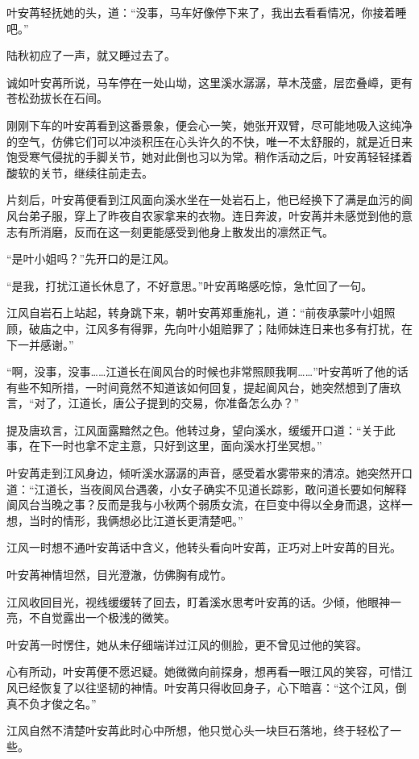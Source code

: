 叶安苒轻抚她的头，道：“没事，马车好像停下来了，我出去看看情况，你接着睡吧。”

陆秋初应了一声，就又睡过去了。

诚如叶安苒所说，马车停在一处山坳，这里溪水潺潺，草木茂盛，层峦叠嶂，更有苍松劲拔长在石间。

刚刚下车的叶安苒看到这番景象，便会心一笑，她张开双臂，尽可能地吸入这纯净的空气，仿佛它们可以冲淡积压在心头许久的不快，唯一不太舒服的，就是近日来饱受寒气侵扰的手脚关节，她对此倒也习以为常。稍作活动之后，叶安苒轻轻揉着酸软的关节，继续往前走去。

片刻后，叶安苒便看到江风面向溪水坐在一处岩石上，他已经换下了满是血污的阆风台弟子服，穿上了昨夜自农家拿来的衣物。连日奔波，叶安苒并未感觉到他的意志有所消磨，反而在这一刻更能感受到他身上散发出的凛然正气。

“是叶小姐吗？”先开口的是江风。

“是我，打扰江道长休息了，不好意思。”叶安苒略感吃惊，急忙回了一句。

江风自岩石上站起，转身跳下来，朝叶安苒郑重施礼，道：“前夜承蒙叶小姐照顾，破庙之中，江风多有得罪，先向叶小姐赔罪了；陆师妹连日来也多有打扰，在下一并感谢。”

“啊，没事，没事……江道长在阆风台的时候也非常照顾我啊……”叶安苒听了他的话有些不知所措，一时间竟然不知道该如何回复，提起阆风台，她突然想到了唐玖言，“对了，江道长，唐公子提到的交易，你准备怎么办？”

提及唐玖言，江风面露黯然之色。他转过身，望向溪水，缓缓开口道：“关于此事，在下一时也拿不定主意，只好到这里，面向溪水打坐冥想。”

叶安苒走到江风身边，倾听溪水潺潺的声音，感受着水雾带来的清凉。她突然开口道：“江道长，当夜阆风台遇袭，小女子确实不见道长踪影，敢问道长要如何解释阆风台当晚之事？反而是我与小秋两个弱质女流，在巨变中得以全身而退，这样一想，当时的情形，我俩想必比江道长更清楚吧。”

江风一时想不通叶安苒话中含义，他转头看向叶安苒，正巧对上叶安苒的目光。

叶安苒神情坦然，目光澄澈，仿佛胸有成竹。

江风收回目光，视线缓缓转了回去，盯着溪水思考叶安苒的话。少倾，他眼神一亮，不自觉露出一个极浅的微笑。

叶安苒一时愣住，她从未仔细端详过江风的侧脸，更不曾见过他的笑容。

心有所动，叶安苒便不愿迟疑。她微微向前探身，想再看一眼江风的笑容，可惜江风已经恢复了以往坚韧的神情。叶安苒只得收回身子，心下暗喜：“这个江风，倒真不负才俊之名。”

江风自然不清楚叶安苒此时心中所想，他只觉心头一块巨石落地，终于轻松了一些。

